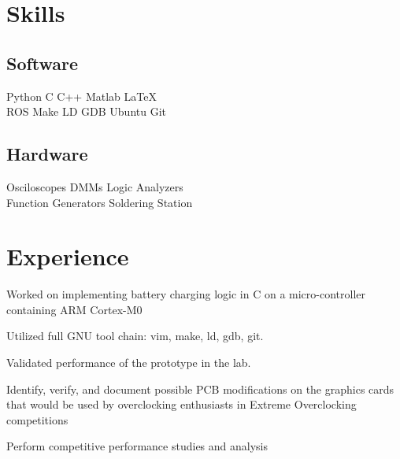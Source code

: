 \documentclass[]{deedy-resume-openfont}
\begin{document}
\section{Skills}
\begin{minipage}[t]{.6\textwidth}
\subsection{Software}
Python \textbullet{} C \textbullet{} C++ \textbullet{} Matlab \textbullet{}
\LaTeX\ \\ 
ROS \textbullet{} Make \textbullet{} LD \textbullet{} GDB \textbullet{} Ubuntu \textbullet{} Git
\sectionsep
\end{minipage}
\hfill
\begin{minipage}[t]{.35\textwidth}
\subsection{Hardware}
Osciloscopes \textbullet{} DMMs \textbullet{} Logic Analyzers\\
Function Generators \textbullet{} Soldering Station\\ 
\end{minipage}

\section{Experience}

\begin{tightemize}
\item Worked on implementing battery charging logic in C on a micro-controller containing ARM Cortex-M0
\item Utilized full GNU tool chain: vim, make, ld, gdb, git.
\item Validated performance of the prototype in the lab.
\end{tightemize}
\sectionsep

\begin{tightemize}
\item Identify, verify, and document possible PCB modifications on the graphics cards that would be used by overclocking enthusiasts in Extreme Overclocking competitions
\item Perform competitive performance studies and analysis 
\end{tightemize}
\sectionsep
\end{document}
